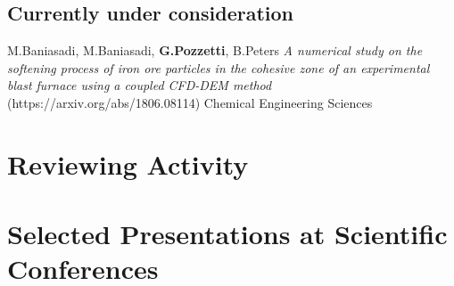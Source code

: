 \documentclass[11pt,a4paper]{moderncv}
\begin{document}

\subsection{\textbf{Currently under consideration}}



 {M.Baniasadi, M.Baniasadi, \textbf{G.Pozzetti}, B.Peters
\textit{A numerical study on the softening process of iron ore particles in the cohesive zone of an experimental blast furnace using a coupled CFD-DEM method} (https://arxiv.org/abs/1806.08114) Chemical Engineering Sciences}

\normalsize
\section{Reviewing Activity}

\section{Selected Presentations at Scientific Conferences}
\end{document}
